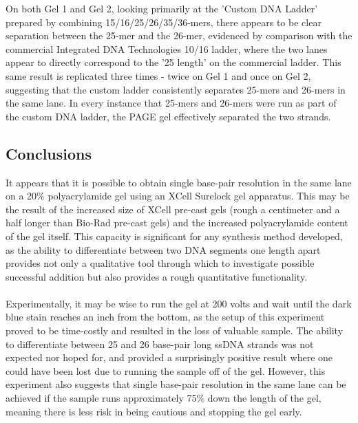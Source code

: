 \documentclass[letterpaper]{article}
\begin{document}
On both Gel 1 and Gel 2, looking primarily at the 'Custom DNA Ladder' prepared by combining 15/16/25/26/35/36-mers, there appears to be clear separation between the 25-mer and the 26-mer, evidenced by comparison with the commercial Integrated DNA Technologies 10/16 ladder, where the two lanes appear to directly correspond to the '25 length' on the commercial ladder. This same result is replicated three times - twice on Gel 1 and once on Gel 2, suggesting that the custom ladder consistently separates 25-mers and 26-mers in the same lane. In every instance that 25-mers and 26-mers were run as part of the custom DNA ladder, the PAGE gel effectively separated the two strands.
\subsection{Conclusions}
It appears that it is possible to obtain single base-pair resolution in the same lane on a 20\% polyacrylamide gel using an XCell Surelock gel apparatus. This may be the result of the increased size of XCell pre-cast gels (rough a centimeter and a half longer than Bio-Rad pre-cast gels) and the increased polyacrylamide content of the gel itself. This capacity is significant for any synthesis method developed, as the ability to differentiate between two DNA segments one length apart provides not only a qualitative tool through which to investigate possible successful addition but also provides a rough quantitative functionality.
\\
\\
Experimentally, it may be wise to run the gel at 200 volts and wait until the dark blue stain reaches an inch from the bottom, as the setup of this experiment proved to be time-costly and resulted in the loss of valuable sample. The ability to differentiate between 25 and 26 base-pair long ssDNA strands was not expected nor hoped for, and provided a surprisingly positive result where one could have been lost due to running the sample off of the gel. However, this experiment also suggests that single base-pair resolution in the same lane can be achieved if the sample runs approximately 75\% down the length of the gel, meaning there is less risk in being cautious and stopping the gel early.



\end{document}
